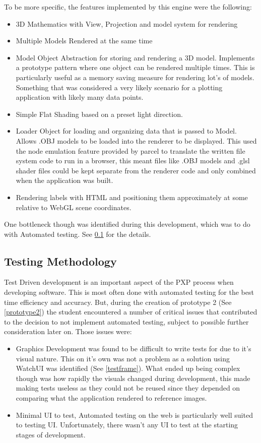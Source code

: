 To be more specific, the features implemented by this engine were the following:
\begin{itemize}
    \item 3D Mathematics with View, Projection and model system for rendering
    \item Multiple Models Rendered at the same time
    \item Model Object Abstraction for storing and rendering a 3D model. Implements a prototype pattern where one object can be rendered multiple times. This is particularly useful as a memory saving measure for rendering lot's of models. Something that was considered a very likely scenario for a plotting application with likely many data points.
    \item Simple Flat Shading based on a preset light direction.
    \item Loader Object for loading and organizing data that is passed to Model. Allows .OBJ models to be loaded into the renderer to be displayed. This used the node emulation feature provided by parcel to translate the written file system code to run in a browser, this meant files like .OBJ models and .glsl shader files could be kept separate from the renderer code and only combined when the application was built.
    \item Rendering labels with HTML and positioning them approximately at some relative to WebGL scene coordinates.
\end{itemize}

One bottleneck though was identified during this development, which was to do with Automated testing. See \ref{automatedtests} for the details.

\subsection{Testing Methodology} \label{automatedtests}
Test Driven development is an important aspect of the PXP process when developing software. This is most often done with automated testing for the best time efficiency and accuracy. But, during the creation of prototype 2 (See \ref{prototype2}) the student encountered a number of critical issues that contributed to the decision to not implement automated testing, subject to possible further consideration later on. Those issues were:

\begin{itemize}
    \item Graphics Development was found to be difficult to write tests for due to it's visual nature. This on it's own was not a problem as a solution using WatchUI was identified (See \ref{testframe}). What ended up being complex though was how rapidly the visuals changed during development, this made making tests useless as they could not be reused since they depended on comparing what the application rendered to reference images.
    \item Minimal UI to test, Automated testing on the web is particularly well suited to testing UI. Unfortunately, there wasn't any UI to test at the starting stages of development.
\end{itemize}

